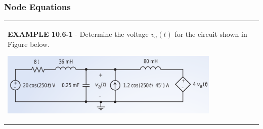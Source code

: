 \documentclass[aspectratio=169]{beamer}
\begin{document}
\begin{frame}[fragile]
	\frametitle{Node Equations }
\begin{tabular}{ll}
	\begin{columns}
		\begin{column}{1\textwidth}  %
		\textbf{EXAMPLE 10.6-1} - Determine the voltage $v_a(t)$ for the circuit shown in Figure below.

		\begin{center}
    			\includegraphics[height=3cm]{figure23.png}	
		\end{center}	
		\scalebox{0.8}{Answer: $v_a(t)=12.43 \cos(250t+81.2^o)\ V$}
		\end{column}
	\end{columns}
\end{tabular}	
\end{frame}
\end{document}
